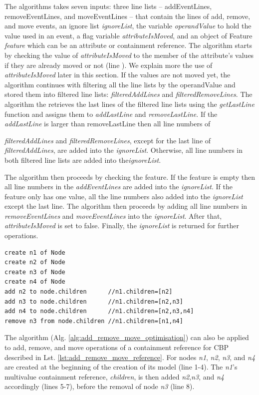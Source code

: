 \documentclass[sigconf]{acmart}
\begin{document}
The algorithms takes seven inputs: three line lists -- addEventLines, removeEventLines, and moveEventLines -- that contain the lines of add, remove, and move events, an ignore list \emph{ignoreList}, the variable \emph{operandValue} to hold the value used in an event, a flag variable \emph{attributeIsMoved}, and an object of Feature \emph{feature} which can be an attribute or containment reference. The algorithm starts by checking the value of \emph{attributeIsMoved} to the member of the attribute's values if they are already moved or not (line ). We explain more the use of \emph{attributeIsMoved} later in this section. If the values are not moved yet, the algorithm continues with filtering all the line lists by the operandValue and stored them into filtered line lists: \emph{filteredAddLines} and \emph{filteredRemoveLines}. The algorithm the retrieves the last lines of the filtered line lists using the \emph{getLastLine} function and assigns them to \emph{addLastLine} and \emph{removeLastLine}. If the \emph{addLastLine} is larger than {removeLastLine} then all line numbers of {\emph{filteredAddLines} and \emph{filteredRemoveLines}, except for the last line of \emph{filteredAddLines}, are added into the \emph{ignoreList}. Otherwise, all line numbers in both filtered line lists are added into the\emph{ignoreList}.

The algorithm then proceeds by checking the feature. If the feature is empty then all line numbers in the \emph{addEventLines} are added into the \emph{ignoreList}. If the feature only has one value, all the line numbers also added into the \emph{ignoreList} except the last line. The algorithm then proceeds by adding all line numbers in \emph{removeEventLines} and \emph{moveEventLines} into the \emph{ignoreList}. After that, \emph{attributeIsMoved} is set to false. Finally, the \emph{ignoreList} is returned for further operations.    

\begin{lstlisting}[style=eol,caption={Example of CBP representation of attribute \emph{values}'s add and remove operations.},label=lst:add_remove_move_reference]
create n1 of Node
create n2 of Node
create n3 of Node
create n4 of Node
add n2 to node.children      //n1.children=[n2] 
add n3 to node.children      //n1.children=[n2,n3] 
add n4 to node.children      //n1.children=[n2,n3,n4] 
remove n3 from node.children //n1.children=[n1,n4] 
\end{lstlisting}

The algorithm (Alg. \ref{alg:add_remove_move_optimisation}) can also be applied to add, remove, and move operations of a containment reference for CBP described in Lst. \ref{lst:add_remove_move_reference}. For nodes \emph{n1}, \emph{n2}, \emph{n3}, and \emph{n4} are created at the beginning of the creation of its model (line 1-4). The \emph{n1}'s multivalue containment reference, \emph{children}, is then added \emph{n2},\emph{n3}, and \emph{n4} accordingly (lines 5-7), before the removal of node \emph{n3} (line 8). 

}
\end{document}
